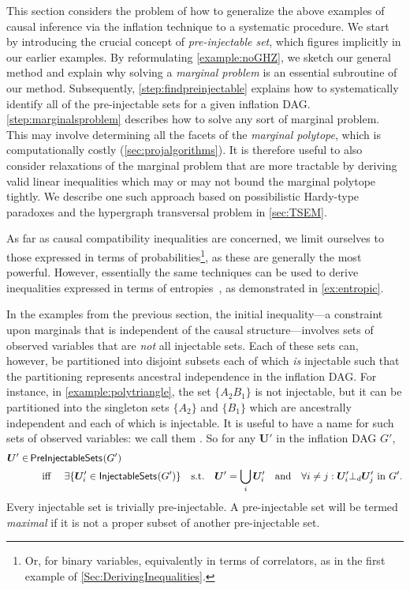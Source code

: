 \documentclass[aps,english,superscriptaddress,onecolumn,twoside,longbibliography,pra,floatfix,fleqn,nofootinbib]{revtex4-1}%
\newcommand*{\tblue}[1]{{\color{MidnightBlue}{\textbf{#1}}}}
\theoremstyle{definition}
\newcounter{example}[section]
\newcommand{\SmallNamedFunction}[3][]{\operatorname{\mathsf{#2}}_{#1}\parenths{#3}}
\newcommand{\aindep}{\ensuremath{\cramp{\perp_d}}} %
\newcommand{\cramp}[1]{\ensuremath{\mathord{#1}}}
\DeclarePairedDelimiter{\parenths}{\lparen}{\rparen}
\begin{document}
This section considers the problem of how to generalize the above examples of causal inference via the inflation technique to a systematic procedure. We start by introducing the crucial concept of \emph{pre-injectable set}, which figures implicitly in our earlier examples. By reformulating \cref{example:noGHZ}, we sketch our general method and explain why solving a \emph{marginal problem} is an essential subroutine of our method. Subsequently, \cref{step:findpreinjectable} explains how to systematically identify all of the pre-injectable sets for a given inflation DAG. \cref{step:marginalsproblem} describes how to solve any sort of marginal problem. This may involve determining all the facets of the \emph{marginal polytope}, which is computationally costly (\cref{sec:projalgorithms}).  It is therefore useful to also consider relaxations of the marginal problem that are more tractable by deriving valid linear inequalities which may or may not bound the marginal polytope tightly. We describe one such approach based on possibilistic Hardy-type paradoxes and the hypergraph transversal problem in \cref{sec:TSEM}.

As far as causal compatibility inequalities are concerned, we limit ourselves to those expressed in terms of probabilities\footnote{Or, for binary variables, equivalently in terms of correlators, as in the first example of \cref{Sec:DerivingInequalities}.}, as these are generally the most powerful. However, essentially the same techniques can be used to derive inequalities expressed in terms of entropies~\cite{fritz2013marginal}, as demonstrated in \cref{ex:entropic}. 

In the examples from the previous section, the initial inequality---a constraint upon marginals that is independent of the causal structure---involves sets of observed variables that are \emph{not} all injectable sets.  Each of these sets can, however, be partitioned into disjoint subsets each of which {\em is} injectable such that the partitioning represents ancestral independence in the inflation DAG. For instance, in \cref{example:polytriangle}, the set $\{ A_2 B_1\}$ is not injectable, but it can be partitioned into the singleton sets $\{ A_2 \}$ and $\{ B_1\}$ which are ancestrally independent and each of which is injectable.  It is useful to have a name for such sets of observed variables: we call them \tblue{pre-injectable}. So for any $\bm{U}'$ in the inflation DAG $G'$,
\begin{align}\label{eq:defpreinj}
\begin{split}
\bm{U}'\in & \SmallNamedFunction{PreInjectableSets}{G'} \\
	& \quad\text{ iff }\quad  \exists \{ \bm{U}'_i \in \SmallNamedFunction{InjectableSets}{G'} \} \quad \text{s.t.}\quad \bm{U}'=\bigcup_i \bm{U}'_i  \quad\text{and} \quad  \forall i\ne j: \bm{U}'_i \aindep \bm{U}'_j \text{ in }G'.
\end{split}
\end{align}
Every injectable set is trivially pre-injectable.  A pre-injectable set will be termed \emph{maximal} if it is not a proper subset of another pre-injectable set.
\end{document}
